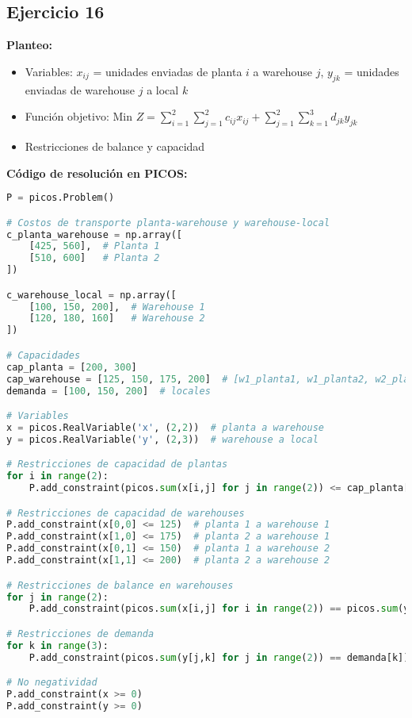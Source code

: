 \documentclass[12pt]{article}
\begin{document}
\subsection*{Ejercicio 16}

\textbf{Planteo:}
\begin{itemize}
\item Variables: $x_{ij}$ = unidades enviadas de planta $i$ a warehouse $j$, $y_{jk}$ = unidades enviadas de warehouse $j$ a local $k$
\item Función objetivo: Min $Z = \sum_{i=1}^2 \sum_{j=1}^2 c_{ij}x_{ij} + \sum_{j=1}^2 \sum_{k=1}^3 d_{jk}y_{jk}$
\item Restricciones de balance y capacidad
\end{itemize}

\textbf{Código de resolución en PICOS:}
\begin{lstlisting}[language=Python]
P = picos.Problem()

# Costos de transporte planta-warehouse y warehouse-local
c_planta_warehouse = np.array([
    [425, 560],  # Planta 1
    [510, 600]   # Planta 2
])

c_warehouse_local = np.array([
    [100, 150, 200],  # Warehouse 1
    [120, 180, 160]   # Warehouse 2
])

# Capacidades
cap_planta = [200, 300]
cap_warehouse = [125, 150, 175, 200]  # [w1_planta1, w1_planta2, w2_planta1, w2_planta2]
demanda = [100, 150, 200]  # locales

# Variables
x = picos.RealVariable('x', (2,2))  # planta a warehouse
y = picos.RealVariable('y', (2,3))  # warehouse a local

# Restricciones de capacidad de plantas
for i in range(2):
    P.add_constraint(picos.sum(x[i,j] for j in range(2)) <= cap_planta[i])

# Restricciones de capacidad de warehouses
P.add_constraint(x[0,0] <= 125)  # planta 1 a warehouse 1
P.add_constraint(x[1,0] <= 175)  # planta 2 a warehouse 1
P.add_constraint(x[0,1] <= 150)  # planta 1 a warehouse 2
P.add_constraint(x[1,1] <= 200)  # planta 2 a warehouse 2

# Restricciones de balance en warehouses
for j in range(2):
    P.add_constraint(picos.sum(x[i,j] for i in range(2)) == picos.sum(y[j,k] for k in range(3)))

# Restricciones de demanda
for k in range(3):
    P.add_constraint(picos.sum(y[j,k] for j in range(2)) == demanda[k])

# No negatividad
P.add_constraint(x >= 0)
P.add_constraint(y >= 0)


\end{lstlisting}
\end{document}
